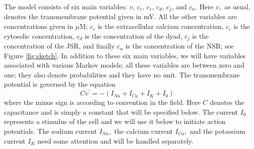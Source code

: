 The model consists of six main variables: $v, \, c_{e}, \, c_{c}, \, c_{d}, \, c_{j}$, and $c_{n}.$
Here $v,$ as usual, denotes the transmembrane potential given in mV. All the
other variables are concentrations given in $\mu$M; $c_{e}$ is the extracellular calcium concentration, $c_{c}$ is the cytosolic
concentration, $c_{d}$ is the concentration of the dyad, $c_{j}$ is the
concentration of the JSR, and finally $c_{n}$ is the concentration of the NSR;
see Figure \ref{fig:sketch}. In addition to these six main variables, we will have
variables associated with various Markov models; all these variables are between zero
and one; they also denote probabilities and they have no unit. The transmembrane
potential is governed by the equation%
\begin{equation}
Cv^{\prime}=-\left(  I_{Na}+I_{Ca}+I_{K}+I_{0}\right)  \label{dvdt50}%
\end{equation}
where the minus sign is according to convention in the field. Here $C$ denotes the
capacitance and is simply a constant that will be specified below. The current
$I_{0}$ represents a stimulus of the cell and we will use it below to initiate
action potentials. The sodium current $I_{Na},$ the calcium current $I_{Ca},$
and the potassium current $I_{K}$ need some attention and will be handled
separately. 

